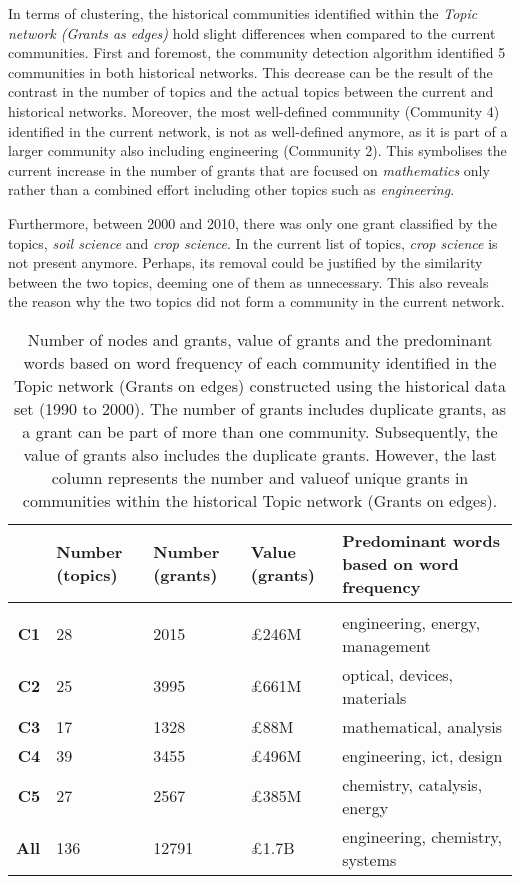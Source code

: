 {In terms of clustering, the historical communities identified within the \textit{Topic network (Grants as edges)} hold slight differences when compared to the current communities. First and foremost, the community detection algorithm identified 5 communities in both historical networks. This decrease can be the result of the contrast in the number of topics and the actual topics between the current and historical networks. Moreover, the most well-defined community (Community 4) identified in the current network, is not as well-defined anymore, as it is part of a larger community also including engineering (Community 2). This symbolises the current increase in the number of grants that are focused on \textit{mathematics} only rather than a combined effort including other topics such as \textit{engineering}.

Furthermore, between 2000 and 2010, there was only one grant classified by the topics, \textit{soil science} and \textit{crop science}. In the current list of topics, \textit{crop science} is not present anymore. Perhaps, its removal could be justified by the similarity between the two topics, deeming one of them as unnecessary. This also reveals the reason why the two topics did not form a community in the current network.

\begin{table}[!htbp]
\centering
\caption{Number of nodes and grants, value of grants and the predominant words based on word frequency of each community identified in the Topic network (Grants on edges) constructed using the historical data set (1990 to 2000). The number of grants includes duplicate grants, as a grant can be part of more than one community. Subsequently, the value of grants also includes the duplicate grants. However, the last column represents the number and valueof unique grants in communities within the historical Topic network (Grants on edges).}
\label{table:topic_a_past2_numbers}
\begin{tabular}{r|>{\raggedleft\arraybackslash}p{1.6cm}>{\raggedleft\arraybackslash}p{1.6cm}>{\raggedleft\arraybackslash}p{1.6cm}>{\raggedleft\arraybackslash}p{6.3cm}}
{} & \textbf{Number (topics)} & \textbf{Number (grants)} & \textbf{Value (grants)} & \textbf{Predominant words based on word frequency}\\
\hline\\
\textbf{C1}  & {28}  & {2015}  & {\pounds246M} & {engineering, energy, management}\\
\textbf{C2}  & {25}  & {3995}  & {\pounds661M} & {optical, devices, materials}\\
\textbf{C3}  & {17}  & {1328}  & {\pounds88M}  & {mathematical, analysis}\\
\textbf{C4}  & {39}  & {3455}  & {\pounds496M} & {engineering, ict, design}\\
\textbf{C5}  & {27}  & {2567}  & {\pounds385M} & {chemistry, catalysis, energy}\\
\textbf{All} & {136} & {12791} & {\pounds1.7B} & {engineering, chemistry, systems}\\
\end{tabular}
\end{table}

}
